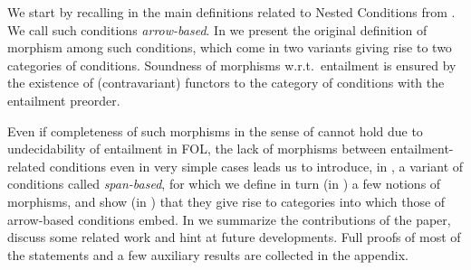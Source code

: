We start by recalling in  the main definitions related to Nested Conditions from \cite{Rensink-FOL}. We call such conditions \emph{arrow-based}.
In  we present the original definition of morphism among such conditions, which come in two variants giving rise to two categories of conditions. Soundness of morphisms w.r.t.~entailment is ensured by the existence of (contravariant) functors to the category of conditions with the entailment preorder.

Even if completeness of such morphisms in the sense of \cite{DBLP:conf/stoc/ChandraM77} cannot hold due to undecidability of entailment in FOL, the lack of morphisms between entailment-related conditions even in very simple cases leads us to introduce, in , a variant of conditions called \emph{span-based}, for which we define in turn (in ) a few notions of morphisms, and show (in ) that they give rise to categories into which those of arrow-based conditions embed.
In  we summarize the contributions of the paper, discuss some related work and hint at future developments.
\iffest
Full proofs of most of the statements and a few auxiliary results are collected in the appendix.

\fi
 